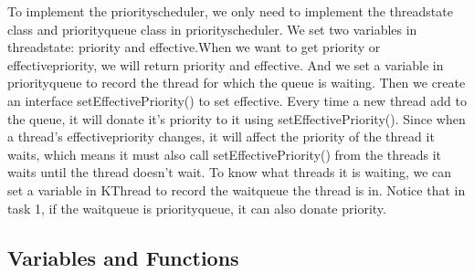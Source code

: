 \documentclass[a4paper,10pt]{article}
\begin{document}
To implement the priorityscheduler, we only need to implement the threadstate class and priorityqueue class in priorityscheduler. We set two variables in threadstate: priority and effective.When we want to get priority or effectivepriority, we will return priority and effective.  And we set a variable in priorityqueue to record the thread for which the queue is waiting. Then we  create an interface setEffectivePriority() to set effective. Every time a new thread add to the queue, it will donate it's priority to it using setEffectivePriority(). Since when a thread's effectivepriority changes, it will affect the priority of the thread it waits, which means it must also call setEffectivePriority() from the threads it waits until the thread doesn't wait. To know what threads it is waiting, we can set a variable in KThread to record the waitqueue the thread is in. Notice that in task 1, if the waitqueue is priorityqueue, it can also donate priority.

\subsection{Variables and Functions}
\end{document}

